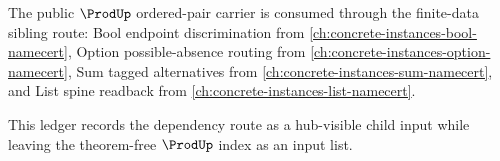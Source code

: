 The public $\ProdUp$ ordered-pair carrier is consumed through the finite-data sibling route: Bool endpoint discrimination from \autoref{ch:concrete-instances-bool-namecert}, Option possible-absence routing from \autoref{ch:concrete-instances-option-namecert}, Sum tagged alternatives from \autoref{ch:concrete-instances-sum-namecert}, and List spine readback from \autoref{ch:concrete-instances-list-namecert}.

This ledger records the dependency route as a hub-visible child input while leaving the theorem-free $\ProdUp$ index as an input list.
